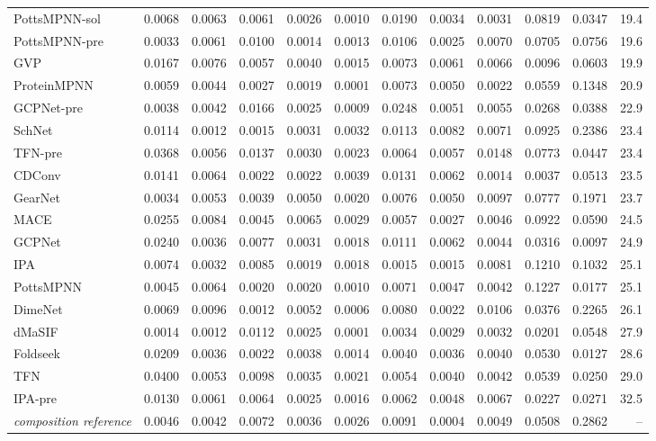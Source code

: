 \begin{longtable}{lrrrrrrrrrrr}
PottsMPNN-sol & 0.0068 & 0.0063 & 0.0061 & 0.0026 & 0.0010 & 0.0190 & 0.0034 & 0.0031 & 0.0819 & 0.0347 & 19.4 \\
PottsMPNN-pre & 0.0033 & 0.0061 & 0.0100 & 0.0014 & 0.0013 & 0.0106 & 0.0025 & 0.0070 & 0.0705 & 0.0756 & 19.6 \\
GVP & 0.0167 & 0.0076 & 0.0057 & 0.0040 & 0.0015 & 0.0073 & 0.0061 & 0.0066 & 0.0096 & 0.0603 & 19.9 \\
ProteinMPNN & 0.0059 & 0.0044 & 0.0027 & 0.0019 & 0.0001 & 0.0073 & 0.0050 & 0.0022 & 0.0559 & 0.1348 & 20.9 \\
GCPNet-pre & 0.0038 & 0.0042 & 0.0166 & 0.0025 & 0.0009 & 0.0248 & 0.0051 & 0.0055 & 0.0268 & 0.0388 & 22.9 \\
SchNet & 0.0114 & 0.0012 & 0.0015 & 0.0031 & 0.0032 & 0.0113 & 0.0082 & 0.0071 & 0.0925 & 0.2386 & 23.4 \\
TFN-pre & 0.0368 & 0.0056 & 0.0137 & 0.0030 & 0.0023 & 0.0064 & 0.0057 & 0.0148 & 0.0773 & 0.0447 & 23.4 \\
CDConv & 0.0141 & 0.0064 & 0.0022 & 0.0022 & 0.0039 & 0.0131 & 0.0062 & 0.0014 & 0.0037 & 0.0513 & 23.5 \\
GearNet & 0.0034 & 0.0053 & 0.0039 & 0.0050 & 0.0020 & 0.0076 & 0.0050 & 0.0097 & 0.0777 & 0.1971 & 23.7 \\
MACE & 0.0255 & 0.0084 & 0.0045 & 0.0065 & 0.0029 & 0.0057 & 0.0027 & 0.0046 & 0.0922 & 0.0590 & 24.5 \\
GCPNet & 0.0240 & 0.0036 & 0.0077 & 0.0031 & 0.0018 & 0.0111 & 0.0062 & 0.0044 & 0.0316 & 0.0097 & 24.9 \\
IPA & 0.0074 & 0.0032 & 0.0085 & 0.0019 & 0.0018 & 0.0015 & 0.0015 & 0.0081 & 0.1210 & 0.1032 & 25.1 \\
PottsMPNN & 0.0045 & 0.0064 & 0.0020 & 0.0020 & 0.0010 & 0.0071 & 0.0047 & 0.0042 & 0.1227 & 0.0177 & 25.1 \\
DimeNet & 0.0069 & 0.0096 & 0.0012 & 0.0052 & 0.0006 & 0.0080 & 0.0022 & 0.0106 & 0.0376 & 0.2265 & 26.1 \\
dMaSIF & 0.0014 & 0.0012 & 0.0112 & 0.0025 & 0.0001 & 0.0034 & 0.0029 & 0.0032 & 0.0201 & 0.0548 & 27.9 \\
Foldseek & 0.0209 & 0.0036 & 0.0022 & 0.0038 & 0.0014 & 0.0040 & 0.0036 & 0.0040 & 0.0530 & 0.0127 & 28.6 \\
TFN & 0.0400 & 0.0053 & 0.0098 & 0.0035 & 0.0021 & 0.0054 & 0.0040 & 0.0042 & 0.0539 & 0.0250 & 29.0 \\
IPA-pre & 0.0130 & 0.0061 & 0.0064 & 0.0025 & 0.0016 & 0.0062 & 0.0048 & 0.0067 & 0.0227 & 0.0271 & 32.5 \\
\midrule
\textit{composition reference} & 0.0046 & 0.0042 & 0.0072 & 0.0036 & 0.0026 & 0.0091 & 0.0004 & 0.0049 & 0.0508 & 0.2862 & -- \\

\end{longtable}
\endgroup
